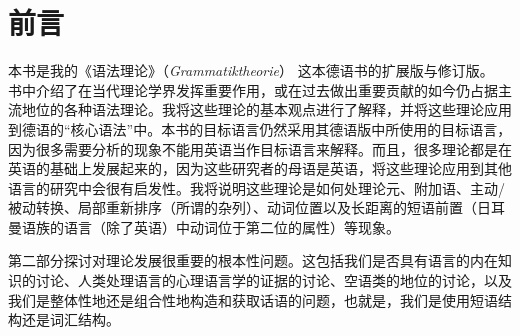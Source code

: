 \chapter{前言}

\largerpage[-1]
本书是我的《语法理论》（\emph{Grammatiktheorie}） \citep{MuellerGTBuch2}这本德语书的扩展版与修订版。
书中介绍了在当代理论学界发挥重要作用，或在过去做出重要贡献的如今仍占据主流地位的各种语法理论。我将这些理论的基本观点进行了解释，并将这些理论应用到德语的“核心语法”中。本书的目标语言仍然采用其德语版中所使用的目标语言，因为很多需要分析的现象不能用英语当作目标语言来解释。而且，很多理论都是在英语的基础上发展起来的，因为这些研究者的母语是英语，将这些理论应用到其他语言的研究中会很有启发性。我将说明这些理论是如何处理论元、附加语、主动/被动转换、局部重新排序（所谓的杂列）、动词位置以及长距离的短语前置（日耳曼语族的语言（除了英语）中动词位于第二位的属性）等现象。

第二部分探讨对理论发展很重要的根本性问题。这包括我们是否具有语言的内在知识的讨论、人类处理语言的心理语言学的证据的讨论、空语类的地位的讨论，以及我们是整体性地还是组合性地构造和获取话语的问题，也就是，我们是使用短语结构还是词汇结构。

